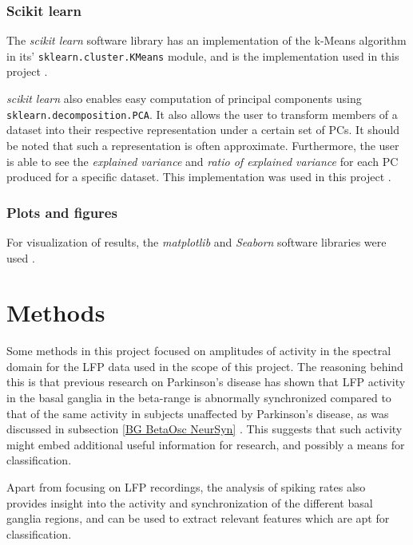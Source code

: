 \documentclass{article}
\begin{document}
\subsubsection{Scikit learn}\label{SK BG}

The \textit{scikit learn} software library has an implementation of the k-Means algorithm in its' \texttt{sklearn.cluster.KMeans} module, and is the implementation used in this project \citep{SKLEARN}.

\textit{scikit learn} also enables easy computation of principal components using \texttt{sklearn.decomposition.PCA}.
It also allows the user to transform members of a dataset into their respective representation under a certain set of PCs. 
It should be noted that such a representation is often approximate.
Furthermore, the user is able to see the \textit{explained variance} and \textit{ratio of explained variance} for each PC produced for a specific dataset. 
This implementation was used in this project \citep{SKLEARN}.

\subsubsection{Plots and figures}

For visualization of results, the \textit{matplotlib} and \textit{Seaborn} software libraries were used \citep{MPL} \citep{Seaborn}.

\newpage
\section{Methods}

Some methods in this project focused on amplitudes of activity in the spectral domain for the LFP data used in the scope of this project.
The reasoning behind this is that previous research on Parkinson's disease has shown that LFP activity in the basal ganglia in the beta-range is abnormally synchronized compared to that of the same activity in subjects unaffected by Parkinson's disease, as was discussed in subsection \ref{BG BetaOsc NeurSyn} \citep{Cagnan}.
This suggests that such activity might embed additional useful information for research, and possibly a means for classification. 

Apart from focusing on LFP recordings, the analysis of spiking rates also provides insight into the activity and synchronization of the different basal ganglia regions, and can be used to extract relevant features which are apt for classification.
\end{document}
